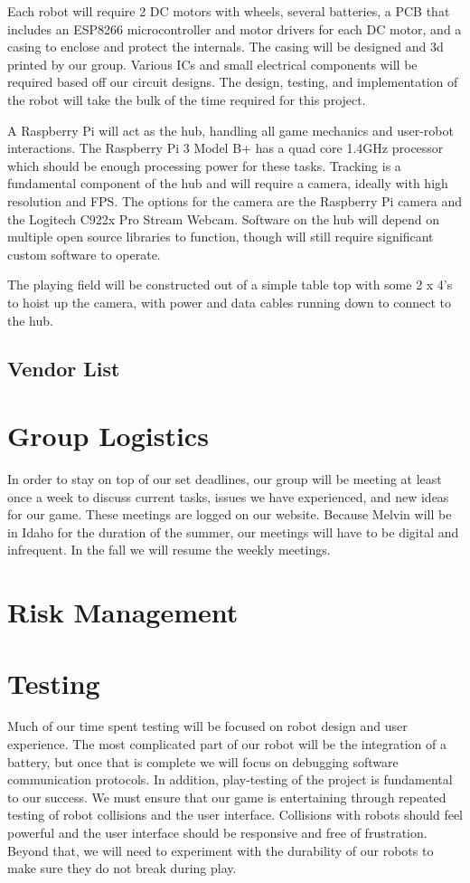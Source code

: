 \documentclass[11pt]{ieeeconf}
\begin{document}
Each robot will require 2 DC motors with wheels, several batteries, a PCB that includes an ESP8266 microcontroller and motor drivers for each DC motor, and a casing to enclose and protect the internals. The casing will be designed and 3d printed by our group. Various ICs and small electrical components will be required based off our circuit designs. The design, testing, and implementation of the robot will take the bulk of the time required for this project.

A Raspberry Pi will act as the hub, handling all game mechanics and user-robot interactions. The Raspberry Pi 3 Model B+ has a quad core 1.4GHz processor which should be enough processing power for these tasks. Tracking is a fundamental component of the hub and will require a camera, ideally with high resolution and FPS. The options for the camera are the Raspberry Pi camera and the Logitech C922x Pro Stream Webcam. Software on the hub will depend on multiple open source libraries to function, though will still require significant custom software to operate.

The playing field will be constructed out of a simple table top with some 2 x 4's to hoist up the camera, with power and data cables running down to connect to the hub.

\subsection{Vendor List}

\section{Group Logistics}
In order to stay on top of our set deadlines, our group will be meeting at least once a week to discuss current tasks, issues we have experienced, and new ideas for our game. These meetings are logged on our website. Because Melvin will be in Idaho for the duration of the summer, our meetings will have to be digital and infrequent. In the fall we will resume the weekly meetings.

\section{Risk Management}

\section{Testing}
Much of our time spent testing will be focused on robot design and user experience. The most complicated part of our robot will be the integration of a battery, but once that is complete we will focus on debugging software communication protocols. In addition, play-testing of the project is fundamental to our success. We must ensure that our game is entertaining through repeated testing of robot collisions and the user interface. Collisions with robots should feel powerful and the user interface should be responsive and free of frustration. Beyond that, we will need to experiment with the durability of our robots to make sure they do not break during play.
\end{document}
